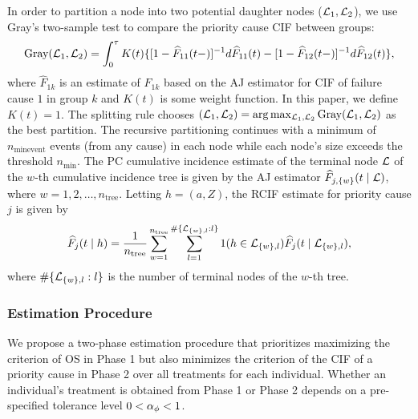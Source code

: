 In order to partition a node into two potential daughter nodes ($\mathcal{L}_1, \mathcal{L}_2$), we use Gray's two-sample test \citep{gray1988} to compare the priority cause CIF between groups: %
\begin{equation}
\label{grays_test}
\text{Gray}(\mathcal{L}_1, \mathcal{L}_2) = \int_0^\tau K(t)\{[1-\widehat{F}_{11}(t-)]^{-1}d\widehat{F}_{11}(t)-[1-\widehat{F}_{12}(t-)]^{-1}d\widehat{F}_{12}(t)\},
\end{equation} where $\widehat{F}_{1k}$ is an estimate of $F_{1k}$ based on the AJ estimator for CIF of failure cause $1$ in group $k$ and $K(t)$ is some weight function. In this paper, we define $K(t) = 1$. The splitting rule chooses \( (\mathcal{L}_1, \mathcal{L}_2) = \arg \max_{\mathcal{L}_1,\mathcal{L}_2} \text{Gray}(\mathcal{L}_1,\mathcal{L}_2) \) as the best partition. The recursive partitioning continues with a minimum of $n_{\text{minevent}}$ events (from any cause) in each node while each node's size exceeds the threshold \(n_{\min}\). The PC cumulative incidence estimate of the terminal node \( \mathcal{L} \) of the \( w \)-th cumulative incidence tree is given by the AJ estimator \( \widehat{F}_{j,\{w\}}(t \mid \mathcal{L}) \), where \( w = 1, 2, \ldots, n_{\text{tree}} \). Letting $h = (a,Z)$, the RCIF estimate for priority cause $j$ is given by
\[
\widehat{F}_j(t \mid h) = \frac{1}{n_{\text{tree}}} \sum_{w=1}^{n_{\text{tree}}} \sum_{l=1}^{\#\{\mathcal{L}_{\{w\},l} : l\}} 1(h \in \mathcal{L}_{\{w\},l}) \widehat{F}_j(t \mid \mathcal{L}_{\{w\},l}),
\]
where \( \#\{\mathcal{L}_{\{w\},l} : l\} \) is the number of terminal nodes of the \( w \)-th tree.



\subsubsection{Estimation Procedure}
\label{sec:methodsapproach}
We propose a two-phase estimation procedure that prioritizes maximizing the criterion of OS in Phase 1 but also minimizes the criterion of the CIF of a priority cause in Phase 2 over all treatments for each individual. Whether an individual's treatment is obtained from Phase 1 or Phase 2 depends on a pre-specified tolerance level $0<\alpha_{\phi}<1$.

